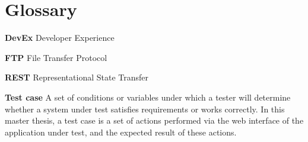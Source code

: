 \chapter{Glossary}

\noindent \textbf{DevEx} Developer Experience

\noindent \textbf{FTP} File Transfer Protocol 

\noindent \textbf{REST} Representational State Transfer

\noindent \textbf{Test case} A set of conditions or variables under which a tester will determine whether a system under test satisfies requirements or works correctly. In this master thesis, a test case is a set of actions performed via the web interface of the application under test, and the expected result of these actions.